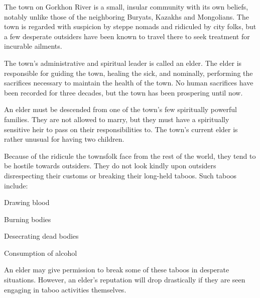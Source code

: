 \documentclass[blue]{guildcamp4}
\begin{document}
\name{\bTownElders{}}

The town on Gorkhon River is a small, insular community with its own beliefs, notably unlike those of the neighboring Buryats, Kazakhs and Mongolians. The town is regarded with suspicion by steppe nomads and ridiculed by city folks, but a few desperate outsiders have been known to travel there to seek treatment for incurable ailments.

The town's administrative and spiritual leader is called an elder. The elder is responsible for guiding the town, healing the sick, and nominally, performing the sacrifices necessary to maintain the health of the town. No human sacrifices have been recorded for three decades, but the town has been prospering until now.

An elder must be descended from one of the town's few spiritually powerful families. They are not allowed to marry, but they must have a spiritually sensitive heir to pass on their responsibilities to. The town's current elder is rather unusual for having two children. 

Because of the ridicule the townsfolk face from the rest of the world, they tend to be hostile towards outsiders. They do not look kindly upon outsiders disrespecting their customs or breaking their long-held taboos. Such taboos include:

\begin{itemz}
	\item Drawing blood
	\item Burning bodies
	\item Desecrating dead bodies
	\item Consumption of alcohol
\end{itemz}

An elder may give permission to break some of these taboos in desperate situations. However, an elder's reputation will drop drastically if they are seen engaging in taboo activities themselves.
\end{document}
